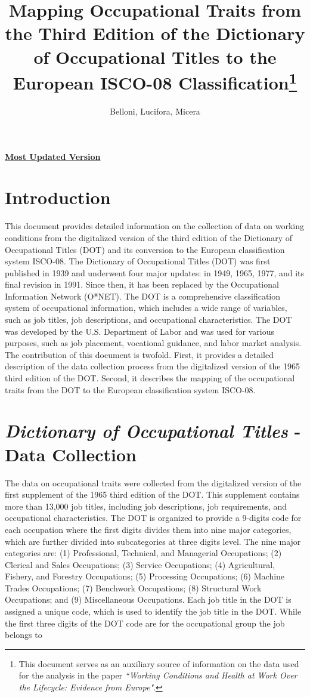 \documentclass[11pt, a4paper, leqno]{article}
\title{Mapping Occupational Traits from the Third Edition of the Dictionary of Occupational Titles to the European ISCO-08 Classification\thanks{This document serves as an auxiliary source of information on the data used for the analysis in the paper \textit{``Working Conditions and Health at Work Over the Lifecycle: Evidence from Europe"}.}}
\author{Belloni, Lucifora, Micera}
\date{}
\begin{document}
\maketitle
\vspace{-6.2em}

\begin{center}  \href{https://github.com/paolomicera/DOT3rd-ISCO08/blob/main/main.pdf}{\textbf{Most Updated Version}}
\end{center}
\section{Introduction}
This document provides detailed information on the collection of data on working conditions from the digitalized version of the third edition of the Dictionary of Occupational Titles (DOT) and its conversion to the European classification system ISCO-08. 
The Dictionary of Occupational Titles (DOT) was first published in 1939 and underwent four major updates: in 1949, 1965, 1977, and its final revision in 1991. Since then, it has been replaced by the Occupational Information Network (O*NET). The DOT is a comprehensive classification system of occupational information, which includes a wide range of variables, such as job titles, job descriptions, and occupational characteristics. The DOT was developed by the U.S. Department of Labor and was used for various purposes, such as job placement, vocational guidance, and labor market analysis. The contribution of this document is twofold. First, it provides a detailed description of the data collection process from the digitalized version of the 1965 third edition of the DOT. Second, it describes the mapping of the occupational traits from the DOT to the European classification system ISCO-08.

\section{\textit{Dictionary of Occupational Titles} - Data Collection}
The data on occupational traits were collected from the digitalized version of the first supplement of the 1965 third edition of the DOT. This supplement contains more than 13,000 job titles, including job descriptions, job requirements, and occupational characteristics. The DOT is organized to provide a 9-digits code for each occupation where the first digits divides them into nine major categories, which are further divided into subcategories at three digits level. The nine major categories are: (1) Professional, Technical, and Managerial Occupations; (2) Clerical and Sales Occupations; (3) Service Occupations; (4) Agricultural, Fishery, and Forestry Occupations; (5) Processing Occupations; (6) Machine Trades Occupations; (7) Benchwork Occupations; (8) Structural Work Occupations; and (9) Miscellaneous Occupations. Each job title in the DOT is assigned a unique code, which is used to identify the job title in the DOT. While the first three digits of the DOT code are for the  occupational group the job belongs to
\end{document}

